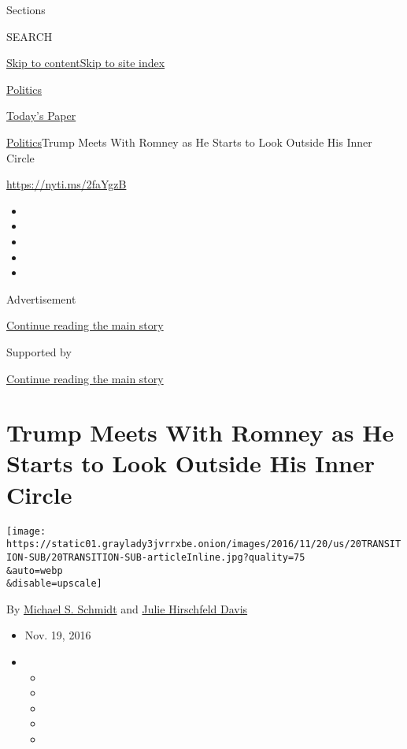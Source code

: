 Sections

SEARCH

\protect\hyperlink{site-content}{Skip to
content}\protect\hyperlink{site-index}{Skip to site index}

\href{https://www.nytimes3xbfgragh.onion/section/politics}{Politics}

\href{https://myaccount.nytimes3xbfgragh.onion/auth/login?response_type=cookie\&client_id=vi}{}

\href{https://www.nytimes3xbfgragh.onion/section/todayspaper}{Today's
Paper}

\href{/section/politics}{Politics}\textbar{}Trump Meets With Romney as
He Starts to Look Outside His Inner Circle

\url{https://nyti.ms/2faYgzB}

\begin{itemize}
\item
\item
\item
\item
\item
\end{itemize}

Advertisement

\protect\hyperlink{after-top}{Continue reading the main story}

Supported by

\protect\hyperlink{after-sponsor}{Continue reading the main story}

\hypertarget{trump-meets-with-romney-as-he-starts-to-look-outside-his-inner-circle}{%
\section{Trump Meets With Romney as He Starts to Look Outside His Inner
Circle}\label{trump-meets-with-romney-as-he-starts-to-look-outside-his-inner-circle}}

\texttt{[image: https://static01.graylady3jvrrxbe.onion/images/2016/11/20/us/20TRANSITION-SUB/20TRANSITION-SUB-articleInline.jpg?quality=75\\\&auto=webp\\\&disable=upscale]}

By \href{http://www.nytimes3xbfgragh.onion/by/michael-s-schmidt}{Michael
S. Schmidt} and
\href{https://www.nytimes3xbfgragh.onion/by/julie-hirschfeld-davis}{Julie
Hirschfeld Davis}

\begin{itemize}
\item
  Nov. 19, 2016
\item
  \begin{itemize}
  \item
  \item
  \item
  \item
  \item
  \end{itemize}
\end{itemize}

